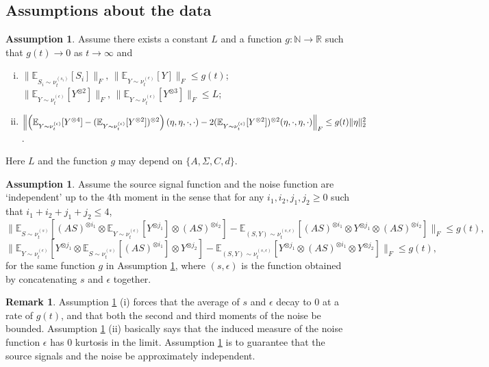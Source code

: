 \documentclass{article} %
\newcommand{\real}{\mathbb{R}}
\renewcommand{\natural}{\mathbb{N}}
\newcommand{\E}{\mathbb{E}}
\theoremstyle{definition}
\newtheorem{remark}[lemma]{Remark}
\newtheorem{assumption}[lemma]{Assumption}
\begin{document}
\subsection{Assumptions about the data}
\label{subsec:assumptions}
\begin{assumption}
\label{ass:gauss}
Assume there exists a constant $L$ and a function $g:\natural\rightarrow \real$ such that $g(t) \to 0$ as $t \to \infty$ and
\begin{enumerate}[(i)]
\vspace{-2mm}
\item $\| \E_{S_i\sim \nu_t^{(s_i)}} [S_i] \|_F,\, \| \E_{Y \sim \nu_t^{(\epsilon)}} [Y] \|_F \le g(t)$; $\| \E_{Y\sim \nu_t^{(\epsilon)}} [Y^{\otimes 2}] \|_F,\, \| \E_{Y\sim \nu_t^{(\epsilon)}} [Y^{\otimes 3}] \|_F \le L$;
\vspace{-2mm}
\item $\Bigl\| \left(\E_{Y\sim \nu_t^{(\epsilon)}} [Y^{\otimes4}] - (\E_{Y\sim \nu_t^{(\epsilon)}} [Y^{\otimes2}])^{\otimes 2}\right)(\eta,\eta,\cdot,\cdot)  - 2 (\E_{Y\sim \nu_t^{(\epsilon)}} [Y^{\otimes2}])^{\otimes 2}(\eta,\cdot,\eta,\cdot)\Bigr\|_F\le g(t)\|\eta\|_2^2$.
\end{enumerate}
Here $L$ and the function $g$ may depend on $\{A,\Sigma,C,d\}$.
\end{assumption}
\begin{assumption}
\label{ass:independence}
Assume the source signal function and the noise function are `independent' up to the 4th moment in the sense that for any $i_1,i_2,j_1,j_2 \ge 0$ such that $i_1+i_2+j_1+j_2 \le 4$,  
\[
 \| \E_{S\sim \nu_t^{(s)}} [(AS)^{\otimes i_1}\!\otimes \E_{Y\sim \nu_t^{(\epsilon)}} [Y^{\otimes j_1}] \!\otimes (AS)^{\otimes i_2}]
- \E_{(S, Y)\sim \nu_t^{(s, \epsilon)}} [(AS)^{\otimes i_1}\!\otimes Y^{\otimes j_1}\!\otimes (AS)^{\otimes i_2}]  \|_F 
 \le g(t),
\]
\vspace{-3mm}
\[
\| \E_{Y\sim \nu_t^{(\epsilon)}} [Y^{\otimes j_1} \otimes \E_{S\sim \nu_t^{(s)}} [(AS)^{\otimes i_1}] \otimes Y^{\otimes j_2}]- \E_{(S, Y)\sim \nu_t^{(s, \epsilon)}} [ Y^{\otimes j_1}\otimes (AS)^{\otimes i_1}\otimes Y^{\otimes j_2}] \|_F 
\le g(t), %
\]
for the same function $g$ in Assumption \ref{ass:gauss}, where $(s,\epsilon)$ is the function obtained by concatenating $s$ and $\epsilon$ together.  
\end{assumption}
\begin{remark}
Assumption \ref{ass:gauss} (i) forces that the average of $s$ and $\epsilon$ decay to 0 at a rate of $g(t)$,
and that both the second and third moments of the noise be bounded.
Assumption \ref{ass:gauss} (ii) basically says that the induced measure of the noise function $\epsilon$ has 0 kurtosis in the limit.
Assumption \ref{ass:independence} is to guarantee that the source signals and the noise be approximately independent.
\end{remark}
\end{document}
